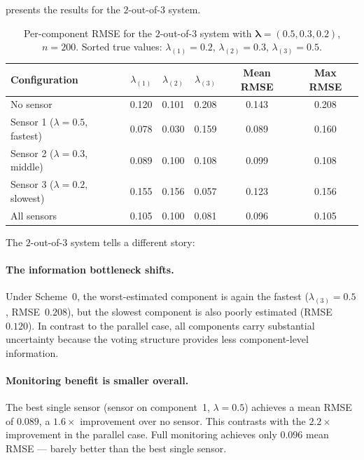 \documentclass[12pt]{article}
\theoremstyle{definition}
\theoremstyle{remark}
\newcommand{\blam}{\boldsymbol{\lambda}}
\begin{document}
 presents the results for the
$2$-out-of-$3$ system.

\begin{table}[t]
\centering
\caption{Per-component RMSE for the $2$-out-of-$3$ system with
$\blam = (0.5, 0.3, 0.2)$, $n = 200$.  Sorted true values:
$\lambda_{(1)} = 0.2$, $\lambda_{(2)} = 0.3$, $\lambda_{(3)} = 0.5$.}
\label{tab:voting-results}
\begin{tabular}{lccccc}
  \toprule
  Configuration & $\lambda_{(1)}$ & $\lambda_{(2)}$ & $\lambda_{(3)}$ &
    Mean RMSE & Max RMSE \\
  \midrule
  No sensor                       & 0.120 & 0.101 & 0.208 & 0.143 & 0.208 \\
  Sensor 1 ($\lambda{=}0.5$, fastest) & 0.078 & 0.030 & 0.159 & 0.089 & 0.160 \\
  Sensor 2 ($\lambda{=}0.3$, middle)  & 0.089 & 0.100 & 0.108 & 0.099 & 0.108 \\
  Sensor 3 ($\lambda{=}0.2$, slowest) & 0.155 & 0.156 & 0.057 & 0.123 & 0.156 \\
  All sensors                     & 0.105 & 0.100 & 0.081 & 0.096 & 0.105 \\
  \bottomrule
\end{tabular}
\end{table}

The $2$-out-of-$3$ system tells a different story:

\paragraph{The information bottleneck shifts.}
Under Scheme~0, the worst-estimated component is again the fastest
($\lambda_{(3)} = 0.5$, RMSE~$0.208$), but the slowest component is
also poorly estimated (RMSE~$0.120$).  In contrast to the parallel
case, all components carry substantial uncertainty because the
voting structure provides less component-level information.

\paragraph{Monitoring benefit is smaller overall.}
The best single sensor (sensor on component~1, $\lambda = 0.5$)
achieves a mean RMSE of $0.089$, a $1.6\times$ improvement over no
sensor.  This contrasts with the $2.2\times$ improvement in the
parallel case.  Full monitoring achieves only $0.096$ mean RMSE ---
barely better than the best single sensor.
\end{document}

